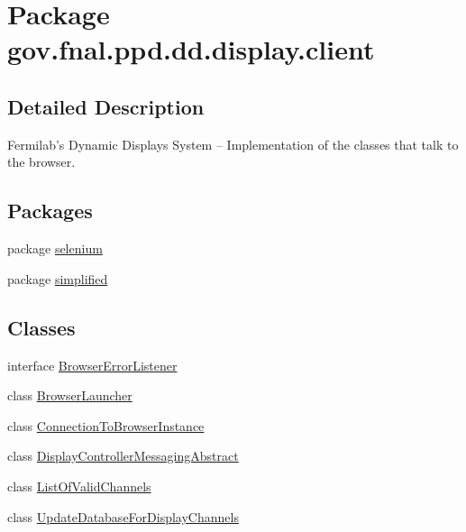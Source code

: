 \hypertarget{namespacegov_1_1fnal_1_1ppd_1_1dd_1_1display_1_1client}{\section{Package gov.\-fnal.\-ppd.\-dd.\-display.\-client}
\label{namespacegov_1_1fnal_1_1ppd_1_1dd_1_1display_1_1client}
}


\subsection{Detailed Description}
Fermilab's Dynamic Displays System -- Implementation of the classes that talk to the browser.\subsection*{Packages}
\begin{DoxyCompactItemize}
\item 
package \hyperlink{namespacegov_1_1fnal_1_1ppd_1_1dd_1_1display_1_1client_1_1selenium}{selenium}
\item 
package \hyperlink{namespacegov_1_1fnal_1_1ppd_1_1dd_1_1display_1_1client_1_1simplified}{simplified}
\end{DoxyCompactItemize}
\subsection*{Classes}
\begin{DoxyCompactItemize}
\item 
interface \hyperlink{interfacegov_1_1fnal_1_1ppd_1_1dd_1_1display_1_1client_1_1BrowserErrorListener}{Browser\-Error\-Listener}
\item 
class \hyperlink{classgov_1_1fnal_1_1ppd_1_1dd_1_1display_1_1client_1_1BrowserLauncher}{Browser\-Launcher}
\item 
class \hyperlink{classgov_1_1fnal_1_1ppd_1_1dd_1_1display_1_1client_1_1ConnectionToBrowserInstance}{Connection\-To\-Browser\-Instance}
\item 
class \hyperlink{classgov_1_1fnal_1_1ppd_1_1dd_1_1display_1_1client_1_1DisplayControllerMessagingAbstract}{Display\-Controller\-Messaging\-Abstract}
\item 
class \hyperlink{classgov_1_1fnal_1_1ppd_1_1dd_1_1display_1_1client_1_1ListOfValidChannels}{List\-Of\-Valid\-Channels}
\item 
class \hyperlink{classgov_1_1fnal_1_1ppd_1_1dd_1_1display_1_1client_1_1UpdateDatabaseForDisplayChannels}{Update\-Database\-For\-Display\-Channels}
\end{DoxyCompactItemize}
